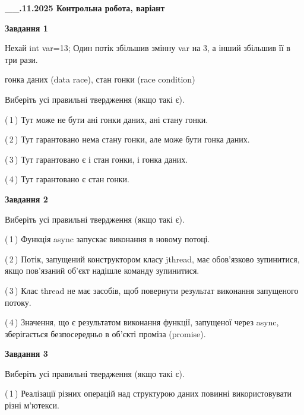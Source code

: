 \documentclass[12pt, ukrainian]{article}
\begin{document}
\begin {large}

\textbf{\_\_.11.2025 Контрольна робота, варіант  }\par


{

\begin{center}
\textbf{Завдання 1}
\end{center}
Нехай int var=13; Один потік збільшив змінну var на 3, а інший збільшив її в три рази.

гонка даних (data race), стан гонки (race condition)

Виберіть усі правильні твердження (якщо такі є).\par
\vspace{2mm}
(\,1\,) Тут може не бути ані гонки даних, ані стану гонки.%

(\,2\,) Тут гарантовано нема стану гонки, але може бути гонка даних.%

(\,3\,) Тут гарантовано є і стан гонки, і гонка даних.%

(\,4\,) Тут гарантовано є стан гонки.%



\begin{center}
\textbf{Завдання 2}
\end{center}
Виберіть усі правильні твердження (якщо такі є).\par
\vspace{2mm}

(\,1\,) Функція async запускає виконання в новому потоці.%

(\,2\,) Потік, запущений конструктором класу jthread, має обов’язково зупинитися, якщо пов’язаний об’єкт надішле команду зупинитися.%

(\,3\,) Клас thread не має засобів, щоб повернути результат виконання запущеного потоку.%

(\,4\,) Значення, що є результатом виконання функції, запущеної через async, зберігається безпосередньо в об’єкті проміза (promise).%



\begin{center}
\textbf{Завдання 3}
\end{center}
Виберіть усі правильні твердження (якщо такі є).\par
\vspace{2mm}

(\,1\,) Реалізації різних операцій над структурою даних повинні використовувати різні м’ютекси.%

}
\end{large}
\end{document}
